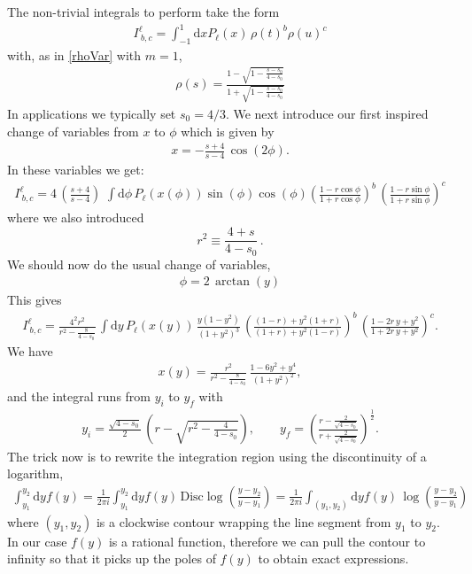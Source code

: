 \documentclass[12pt]{article}
\newcommand{\begBvR}[1]{\begin{#1}}
\newcommand{\beq}{\begBvR{equation}}
\newcommand{\eeq}{\end{equation}}
\newcommand{\bea}{\begBvR{eqnarray}}
\newcommand{\eea}{\end{eqnarray}}
\newcommand{\ud}{\mathrm d}
\newcommand{\<}{{\langle}}
\renewcommand{\>}{{\rangle}}
\begin{document}
The non-trivial integrals to perform take the form
\bea
I^{\ell}_{\ b,c}=\int_{-1}^1 \ud x P_{\ell}(x)\, \rho(t)^b \rho(u)^c
\eea
with, as in \eqref{rhoVar} with $m = 1$,
\bea
\rho(s)=\frac{1-\sqrt{1-\frac{s-s_0}{4-s_0}}}{1+\sqrt{1-\frac{s-s_0}{4-s_0}}}
\eea
In applications we typically set $s_0=4/3$. We next introduce our first inspired change of variables from $x$ to $\phi$ which is given by
\bea
x=-\frac{s+4}{s-4}\, \cos(2 \phi).
\eea
In these variables we get:
\bea
I^{\ell}_{\ b,c}=4\,\left(\frac{s+4}{s-4}\right)\,\, \int \ud \phi \,P_{\ell}(x(\phi)) \sin(\phi)\cos(\phi) \left(\frac{1-r \cos \phi}{1+r \cos \phi}\right)^b\,\left(\frac{1-r \sin \phi}{1+r \sin \phi}\right)^c
\eea
where we also introduced
\beq
r^2 \equiv \frac{4+s}{4-s_0}\,.
\eeq
We should now do the usual change of variables,
\bea
\phi=2\,\arctan(y)
\eea
This gives
\bea
I^{\ell}_{\ b,c}= \frac{4^{2}r^2}{r^2-\frac{8}{4-s_0}} \, \int \ud y \,P_{\ell}(x(y))\,\frac{y(1-y^2)}{(1+y^2)^3}\, \left(\frac{(1-r)+y^2(1+r)}{(1+r)+y^2(1-r)}\right)^b\,\left(\frac{1-2r\,y+y^2}{1+2 r\,y+y^2}\right)^c.
\eea
We have
\bea
x(y)=\frac{r^2}{r^2-\frac{8}{4-s_0}}\, \frac{1-6 y^2+y^4}{(1+y^2)^2},
\eea
and the integral runs from $y_i$ to $y_f$ with
\bea
y_i=\frac{\sqrt{4-s_0}}2\, \left(r-\sqrt{r^2-\frac{4}{4-s_0}}\right), \qquad y_f=\left(\frac{r-\frac{2}{\sqrt{4-s_0}}}{r+\frac{2}{\sqrt{4-s_0}}}\right)^{\frac 12}.
\eea
The trick now is to rewrite the integration region using the discontinuity of a logarithm,
\bea
\int_{y_1}^{y_2} \ud y f(y)=\frac{1}{2 \pi i} \int_{y_1}^{y_2}
\ud yf(y)\,\mbox{Disc} \log\left(\frac{y-y_2}{y-y_1}\right)=\frac{1}{2 \pi i} \int_{(y_1,y_2)} \ud yf(y)\, \log\left(\frac{y-y_2}{y-y_1}\right)
\eea
where $(y_1,y_2)$ is a clockwise contour wrapping the line segment from $y_1$ to $y_2$. In our case $f(y)$ is a rational function, therefore we can  pull the contour to infinity so that it picks up the poles of $f(y)$  to obtain exact expressions. 
\end{document}
